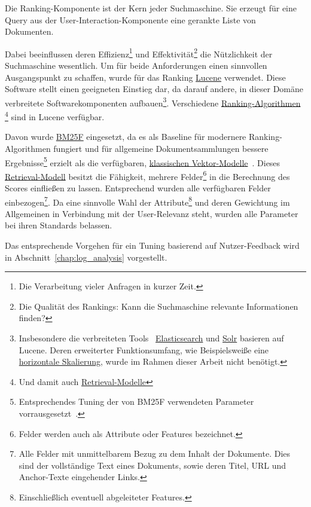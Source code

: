Die Ranking-Komponente ist der Kern jeder Suchmaschine.
Sie erzeugt für eine Query aus der User-Interaction-Komponente eine gerankte Liste von Dokumenten.

Dabei beeinflussen deren Effizienz\footnote{Die Verarbeitung vieler Anfragen in kurzer Zeit.}
und Effektivität\footnote{Die Qualität des Rankings: Kann die Suchmaschine relevante Informationen finden?}
die Nützlichkeit der Suchmaschine wesentlich.
Um für beide Anforderungen einen sinnvollen Ausgangspunkt zu schaffen, wurde für das Ranking
\href{https://lucene.apache.org/}{Lucene} verwendet.
Diese Software stellt einen geeigneten Einstieg dar, da darauf andere,
in dieser Domäne verbreitete Softwarekomponenten aufbauen\footnote{Insbesondere die verbreiteten Tools~\cite{dbengines}
\href{https://de.wikipedia.org/wiki/Elasticsearch}{Elasticsearch} und \href{http://lucene.apache.org/solr/}{Solr}
basieren auf Lucene. Deren erweiterter Funktionsumfang, wie Beispielsweiße eine
\href{http://www.searchdatacenter.de/definition/Horizontale-Skalierung-Scale-out}{horizontale Skalierung}, wurde im Rahmen dieser Arbeit nicht benötigt.}.
Verschiedene \href{https://en.wikipedia.org/wiki/Ranking_(information_retrieval)}{Ranking-Algorithmen}
\footnote{Und damit auch 
\href{https://de.wikipedia.org/wiki/Information_Retrieval\#Retrievalmodelle}{Retrieval-Modelle}}
sind in Lucene verfügbar.

Davon wurde \href{https://en.wikipedia.org/wiki/Okapi_BM25}{BM25F} eingesetzt,
da es als Baseline für modernere Ranking-Algorithmen fungiert und für allgemeine
Dokumentsammlungen bessere Ergebnisse\footnote{Entsprechendes Tuning der von BM25F verwendeten Parameter vorrausgesetzt~\cite{baeza_yates.107}.}
erzielt als die verfügbaren,
\href{https://opensourceconnections.com/blog/2015/10/16/bm25-the-next-generation-of-lucene-relevation/}{klassischen Vektor-Modelle}~\cite{baeza_yates.107}.
Dieses \href{https://de.wikipedia.org/wiki/Information_Retrieval#Retrievalmodelle}{Retrieval-Modell}
besitzt die Fähigkeit, mehrere Felder\footnote{Felder werden auch als Attribute oder Features bezeichnet.} in die Berechnung des Scores einfließen zu lassen.
Entsprechend wurden alle verfügbaren Felder 
einbezogen\footnote{Alle Felder mit unmittelbarem Bezug zu dem Inhalt der Dokumente.
Dies sind der vollständige Text eines Dokuments, sowie deren Titel, URL und Anchor-Texte eingehender Links.}.
Da eine sinnvolle Wahl der Attribute\footnote{Einschließlich eventuell abgeleiteter Features.}
und deren Gewichtung im Allgemeinen in
Verbindung mit der User-Relevanz steht, wurden alle Parameter bei ihren Standards belassen.

Das entsprechende Vorgehen für ein Tuning basierend auf Nutzer-Feedback
wird in Abschnitt~\ref{chap:log_analysis} vorgestellt.
